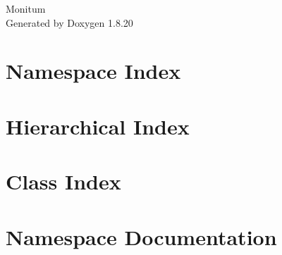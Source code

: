 \let\mypdfximage\pdfximage\def\pdfximage{\immediate\mypdfximage}\documentclass[twoside]{book}
\newcommand{\+}{\discretionary{\mbox{\scriptsize$\hookleftarrow$}}{}{}}
\newcommand{\clearemptydoublepage}{%
  \newpage{\pagestyle{empty}\cleardoublepage}%
}
\begin{document}
\hypersetup{pageanchor=false,
             bookmarksnumbered=true,
             pdfencoding=unicode
            }
\begin{titlepage}
\vspace*{7cm}
\begin{center}%
{\Large Monitum }\\
\vspace*{1cm}
{\large Generated by Doxygen 1.8.20}\\
\end{center}
\end{titlepage}
\clearemptydoublepage
{}
\tableofcontents
\clearemptydoublepage
{}
\hypersetup{pageanchor=true}

\chapter{Namespace Index}

\chapter{Hierarchical Index}

\chapter{Class Index}

\chapter{Namespace Documentation}








\end{document}
